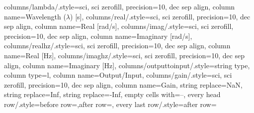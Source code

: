 {columns/lambda/.style={sci, sci zerofill, precision=10, dec sep align, column name={Wavelength ($\lambda$) [s]}},
columns/real/.style={sci, sci zerofill, precision=10, dec sep align, column name={Real [rad/s]}},
columns/imag/.style={sci, sci zerofill, precision=10, dec sep align, column name={Imaginary [rad/s]}},
columns/realhz/.style={sci, sci zerofill, precision=10, dec sep align, column name={Real [Hz]}},
columns/imaghz/.style={sci, sci zerofill, precision=10, dec sep align, column name={Imaginary [Hz]}},
columns/outputtoinput/.style={string type, column type=l, column name={Output/Input}},
columns/gain/.style={sci, sci zerofill, precision=10, dec sep align, column name={Gain}},
string replace={NaN}{},
string replace={Inf}{},
string replace={-Inf}{},
empty cells with={--},
every head row/.style={before row=\toprule,after row=\midrule},
every last row/.style={after row=\bottomrule}}
